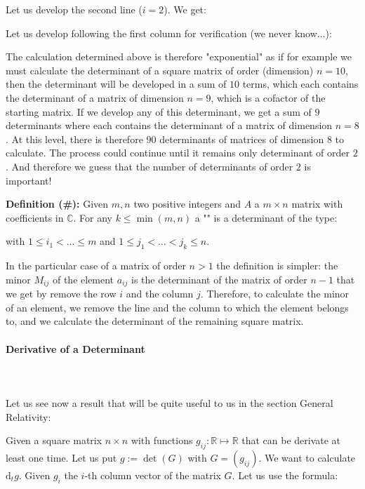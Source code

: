 \begin{enumerate}
\begin{tcolorbox}[colframe=black,colback=white,sharp corners]
		Let us develop the second line ($i=2$). We get:
		\end{tcolorbox}
		
		\pagebreak
		\begin{tcolorbox}[colframe=black,colback=white,sharp corners]
			
		Let us develop following the first column for verification (we never know...):
		
		The calculation determined above is therefore "exponential" as if for example we must calculate the determinant of a square matrix of order (dimension) $n=10$, then the determinant will be developed in a sum of $10$ terms, which each contains the determinant of a matrix of dimension $n=9$, which is a cofactor of the starting matrix. If we develop any of this determinant, we get a sum of $9$ determinants where each contains the determinant of a matrix of dimension $n=8$. At this level, there is therefore $90$ determinants of matrices of dimension $8$ to calculate. The process could continue until it remains only determinant of order $2$. And therefore we guess that the number of determinants of order $2$ is important!
		\end{tcolorbox}
	\end{enumerate}

	\textbf{Definition (\#\mydef):} Given $m,n$ two positive integers and $A$ a $m\times n$ matrix with coefficients in $\mathbb{C}$. For any $k\leq \min(m,n)$ a "" is a determinant of the type:	
	
	with $1\leq i_1< \ldots \leq m$ and $1\leq j_1 <\ldots <j_k\leq n$.
	
	In the particular case of a matrix of order $n>1$ the definition is simpler: the minor $M_{ij}$ of the element $a_{ij}$ is the determinant of the matrix of order $n-1$ that we get by remove the row $i$ and the column $j$. Therefore, to calculate the minor of an element, we remove the line and the column to which the element belongs to, and we calculate the determinant of the remaining square matrix.
	
	\pagebreak
	\paragraph{Derivative of a Determinant}\mbox{}\\\\
	Let us see now a result that will be quite useful to us in the section General Relativity:

	Given a square matrix $n\times n$ with functions $g_{ij}:\mathbb{R}\mapsto \mathbb{R}$ that can be derivate at least one time. Let us put $g:=\det(G)$ with $G=(g_{ij})$. We want to calculate $\mathrm{d}_t g$. Given $g_i$ the $i$-th column vector of the matrix $G$. Let us use the formula:
	
